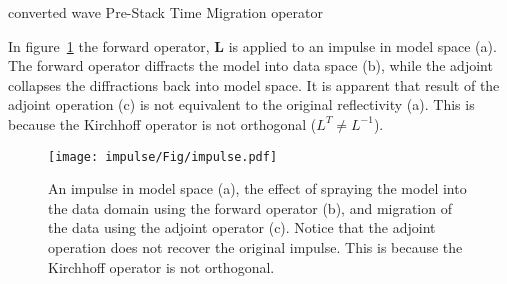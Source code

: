 \begin{algorithm}
\small
\caption{converted wave Pre-Stack Time Migration operator}\label{Kirchhoff}
\begin{algorithmic}
           \EndIf
           \EndIf
         \EndFor
       \EndFor
     \EndFor
   \EndFor
\EndProcedure
\end{algorithmic}
\end{algorithm}

In figure~\ref{fig:impulse} the forward operator, $\mathbf{L}$  is applied to an impulse in model space (a). The forward operator diffracts the model into data space (b), while the adjoint collapses the diffractions back into model space. It is apparent that result of the adjoint operation (c) is not equivalent to the original reflectivity (a). This is because the Kirchhoff operator is not orthogonal ($L^T\neq L^{-1}$). 

\begin{figure}[h] %
	\centering
	\texttt{[image: impulse/Fig/impulse.pdf]}
	\caption{An impulse in model space (a), the effect of spraying the model into the data domain using the forward operator (b), and migration of the data using the adjoint operator (c). Notice that the adjoint operation does not recover the original impulse. This is because the Kirchhoff operator is not orthogonal.}
	\label{fig:impulse}
\end{figure}

